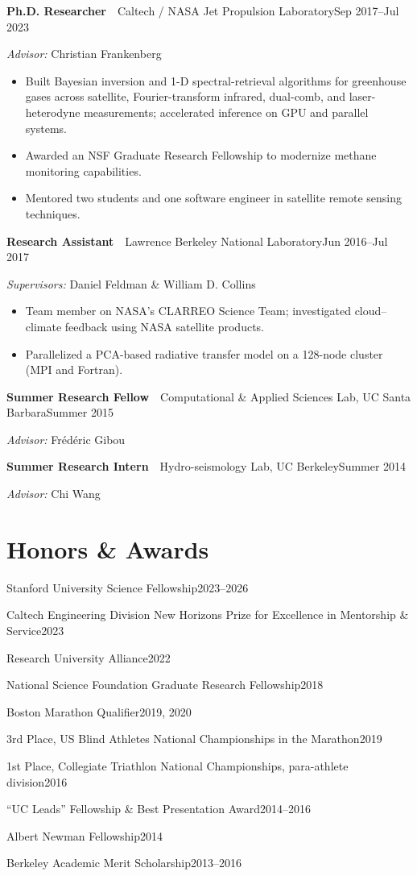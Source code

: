 \documentclass[11pt,letterpaper]{article}
\newcommand{\entry}[3]{\noindent\textbf{#1}~\textbar~#2\hfill{#3}\par}
\newcommand{\simpleentry}[2]{\noindent #1\hfill{#2}\par\vspace{1pt}}
\let\oldsection\section
\renewcommand{\section}[1]{\Needspace*{5\baselineskip}\oldsection{#1}}
\begin{document}
\entry{Ph.D. Researcher}{Caltech / NASA Jet Propulsion Laboratory}{Sep 2017--Jul 2023}
\textit{Advisor:} Christian Frankenberg
\begin{itemize}
  \item Built Bayesian inversion and 1-D spectral-retrieval algorithms for greenhouse gases across satellite, Fourier-transform infrared, dual-comb, and laser-heterodyne measurements; accelerated inference on GPU and parallel systems.
  \item Awarded an NSF Graduate Research Fellowship to modernize methane monitoring capabilities.
  \item Mentored two students and one software engineer in satellite remote sensing techniques.
\end{itemize}
\vspace{4pt}

\entry{Research Assistant}{Lawrence Berkeley National Laboratory}{Jun 2016--Jul 2017}
\textit{Supervisors:} Daniel Feldman \& William D. Collins
\begin{itemize}
  \item Team member on NASA's CLARREO Science Team; investigated cloud--climate feedback using NASA satellite products.
  \item Parallelized a PCA-based radiative transfer model on a 128-node cluster (MPI and Fortran).
\end{itemize}
\vspace{4pt}

\entry{Summer Research Fellow}{Computational \& Applied Sciences Lab, UC Santa Barbara}{Summer 2015}
\textit{Advisor:} Fr\'ed\'eric Gibou
\vspace{3pt}

\entry{Summer Research Intern}{Hydro-seismology Lab, UC Berkeley}{Summer 2014}
\textit{Advisor:} Chi Wang

\section{Honors \& Awards}

\simpleentry{Stanford University Science Fellowship}{2023--2026}
\simpleentry{Caltech Engineering Division New Horizons Prize for Excellence in Mentorship \& Service}{2023}
\simpleentry{Research University Alliance}{2022}
\simpleentry{National Science Foundation Graduate Research Fellowship}{2018}
\simpleentry{Boston Marathon Qualifier}{2019, 2020}
\simpleentry{3rd Place, US Blind Athletes National Championships in the Marathon}{2019}
\simpleentry{1st Place, Collegiate Triathlon National Championships, para-athlete division}{2016}
\simpleentry{``UC Leads'' Fellowship \& Best Presentation Award}{2014--2016}
\simpleentry{Albert Newman Fellowship}{2014}
\simpleentry{Berkeley Academic Merit Scholarship}{2013--2016}
\end{document}
